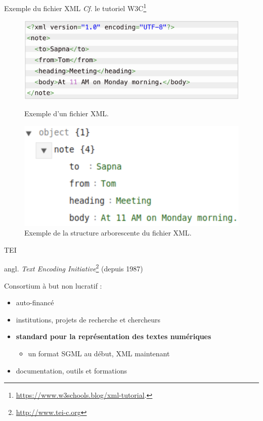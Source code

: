 \documentclass[xetex,xcolor={table,usenames,dvipsnames}]{beamer}
\newcommand{\bolder}[1]{{\color{purple}\bfseries#1}}
\begin{document}
\begin{frame}{Exemple du fichier \textsc{XML}}
	\textit{Cf.} le tutoriel \textsc{W3C}\footnote{\url{https://www.w3schools.blog/xml-tutorial}.}
	   \begin{figure}[ht]
		\begin{minipage}[b]{0.45\linewidth}
			\centering
			\includegraphics[width=\textwidth]{img/xml_note_xml.png}
			\caption{Exemple d'un fichier \textsc{XML}.}
			\label{fig:a}
		\end{minipage}
		\hspace{0.5cm}
		\begin{minipage}[b]{0.45\linewidth}
			\centering
			\includegraphics[width=\textwidth]{img/xml_note.png}
			\caption{Exemple de la structure arborescente du fichier \textsc{XML}.}
			\label{fig:b}
		\end{minipage}
	\end{figure}
\end{frame}

\begin{frame}{\textsc{TEI}}

{\small angl. \textit{Text Encoding Initiative}\footnote{\url{http://www.tei-c.org}}} (depuis 1987)

Consortium à but non lucratif :
\begin{itemize}
	\item auto-financé
	\item institutions, projets de recherche et chercheurs
	\item \bolder{standard pour la représentation des textes
	numériques}
	\begin{itemize}
		\item un format \textsc{SGML} au début, \textsc{XML} maintenant
		\end{itemize}
	\item documentation, outils et formations
\end{itemize}
\end{frame}
\end{document}
